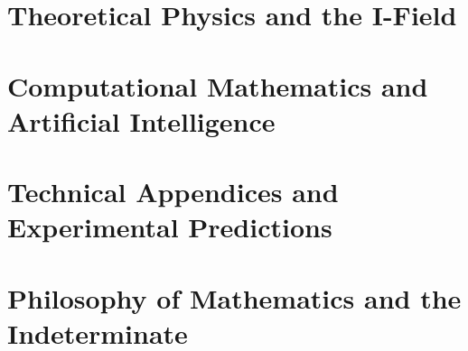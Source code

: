 \documentclass[12pt,a4paper,twoside,openright]{book}
\theoremstyle{definition}
\theoremstyle{remark}
\begin{document}
\part{Theoretical Physics and the I-Field}
\label{part:physics}







\part{Computational Mathematics and Artificial Intelligence}
\label{part:computation}






\part{Technical Appendices and Experimental Predictions}
\label{part:appendices}






\part{Philosophy of Mathematics and the Indeterminate}
\label{part:philosophy}





\backmatter

\printbibliography
\end{document}
